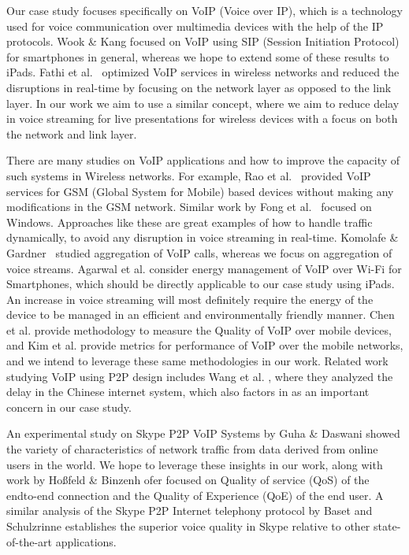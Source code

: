 Our case study focuses specifically on VoIP (Voice over IP), which is a 
technology used for voice communication over multimedia devices with the help of 
the IP protocols. Wook \& Kang \cite{HS_VoIP_ICTC10} focused on VoIP using SIP 
(Session 
Initiation 
Protocol) for smartphones in general, whereas we hope to extend some of these 
results to iPads.  Fathi et al.~\cite{HSR_VoIP_TVT07} optimized VoIP services 
in wireless networks 
and reduced the disruptions in real-time by focusing on the network layer as 
opposed to the link layer.   In our work we aim to use a similar concept, where 
we aim to reduce delay in voice streaming for live presentations for wireless 
devices with a focus on both the network and link layer.  
 
There are many studies on VoIP applications and how to improve the capacity of 
such systems in Wireless networks.  For example, Rao et 
al.~\cite{HYS_VoIP_COM00} provided VoIP 
services for GSM (Global System for Mobile) based devices without making any 
modifications in the GSM network.  Similar work by Fong et 
al.~\cite{MRSR_VoIP_COM08} focused on 
Windows.  Approaches like these are great examples of how to handle traffic 
dynamically, to avoid any disruption in voice streaming in real-time. Komolafe 
\& Gardner~\cite{OR_VoIP_PMC03} studied aggregation of VoIP calls, whereas we 
focus on 
aggregation 
of voice streams. Agarwal et al. \cite{YRAP_VoIP_MSYS07} consider energy 
management of VoIP over 
Wi-Fi for Smartphones, which should be directly applicable to our case study 
using iPads.  An increase in voice streaming will most definitely require the 
energy of the device to be managed in an efficient and environmentally friendly 
manner.   Chen et al. \cite{WPY_VoIP_SYS11} provide methodology to measure the 
Quality of VoIP 
over mobile devices, and Kim et al. \cite{DHMS_WiMAX_WOW08} provide metrics for 
performance of VoIP 
over the mobile networks, and we intend to leverage these same methodologies in 
our work.  Related work studying VoIP using P2P design includes Wang et al. 
\cite{GCXZ_P2PVoIP_MTA13}, where they analyzed the delay in the Chinese internet 
system, which also 
factors in as an important concern in our case study.
 
An experimental study on Skype P2P VoIP Systems by Guha \& Daswani 
\cite{SN_Skype_CIST05} showed 
the variety of characteristics of network traffic from data derived from online 
users in the world.  We hope to leverage these insights in our work, along with 
work by  Hoßfeld \& Binzenh ofer \cite{TA_Skype_COMPNET08} focused on Quality of 
service (QoS) of 
the 
endto-end connection and the Quality of Experience (QoE) of the end user. A 
similar analysis of the Skype P2P Internet telephony protocol by Baset and 
Schulzrinne \cite{SH_Skype_INFO06} establishes the superior voice quality in 
Skype relative to 
other state-of-the-art applications.
 
